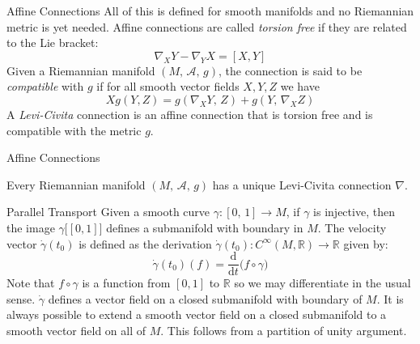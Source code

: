 \documentclass{beamer}
\begin{document}
    \begin{frame}{Affine Connections}
        All of this is defined for smooth manifolds and no Riemannian metric is
        yet needed. Affine connections are called \textit{torsion free} if they
        are related to the Lie bracket:
        \begin{equation}
            \nabla_{X}Y-\nabla_{Y}X=[X,Y]
        \end{equation}
        Given a Riemannian manifold $(M,\,\mathcal{A},\,g)$, the connection is
        said to be \textit{compatible} with $g$ if for all smooth vector fields
        $X,Y,Z$ we have
        \begin{equation}
            Xg(Y,Z)=g(\nabla_{X}Y,\,Z)+g(Y,\,\nabla_{X}Z)
        \end{equation}
        A \textit{Levi-Civita} connection is an affine connection that is
        torsion free and is compatible with the metric $g$.
    \end{frame}
    \begin{frame}{Affine Connections}
        \begin{theorem}
            Every Riemannian manifold $(M,\,\mathcal{A},\,g)$ has a unique
            Levi-Civita connection $\nabla$.
        \end{theorem}
    \end{frame}
    \begin{frame}{Parallel Transport}
        Given a smooth curve $\gamma:[0,\,1]\rightarrow{M}$, if $\gamma$ is
        injective, then the image $\gamma\big[[0,1]\big]$ defines a
        submanifold with boundary in $M$. The velocity vector
        $\dot{\gamma}(t_{0})$ is defined as the derivation
        $\dot{\gamma}(t_{0}):C^{\infty}(M,\mathbb{R})\rightarrow\mathbb{R}$
        given by:
        \begin{equation}
            \dot{\gamma}(t_{0})(f)=
                \frac{\textrm{d}}{\textrm{d}t}\Big(f\circ\gamma\Big)
        \end{equation}
        Note that $f\circ\gamma$ is a function from $[0,1]$ to $\mathbb{R}$ so
        we may differentiate in the usual sense. $\dot{\gamma}$ defines a vector
        field on a closed submanifold with boundary of $M$. It is always
        possible to extend a smooth vector field on a closed submanifold to a
        smooth vector field on all of $M$. This follows from a partition of
        unity argument.
    \end{frame}
\end{document}
